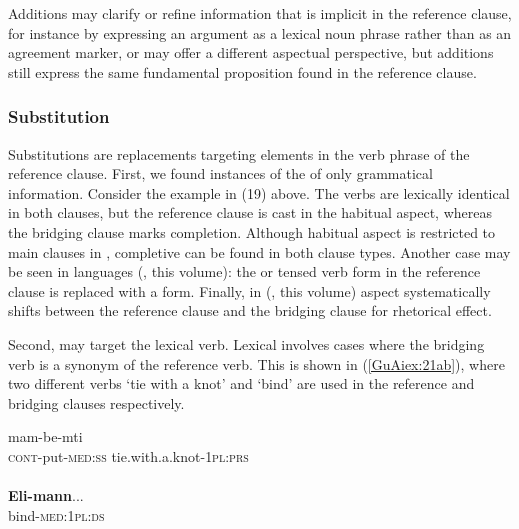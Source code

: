 \documentclass[output=paper]{LSP/langsci}
\begin{document}
Additions may clarify or refine information that is implicit in the reference clause, for instance by expressing an argument as a lexical noun phrase rather than as an agreement marker, or may offer a different aspectual perspective, but additions still express the same fundamental proposition found in the reference clause.

\subsubsection{Substitution}
\label{GuAi314subst}
Substitutions are replacements targeting elements in the verb phrase of the reference clause. First, we found instances of the  of only grammatical information. Consider the  example in (19) above. The verbs are lexically identical in both clauses, but the reference clause is cast in the habitual aspect, whereas the bridging clause marks completion. Although habitual aspect is restricted to main clauses in , completive can be found in both clause types. Another case may be seen in  languages (\citeauthor{anker18}, this volume): the  or tensed verb form in the reference clause is replaced with a  form. Finally, in  (\citeauthor{jarkey18}, this volume) aspect systematically shifts between the reference clause and the bridging clause for rhetorical effect.

Second,  may target the lexical verb. Lexical  involves cases where the bridging verb is a synonym of the reference verb. This is shown in (\ref{GuAiex:21ab}), where two different verbs `tie with a knot' and `bind' are used in the reference and bridging clauses respectively. 

\begin{exe}
\ex \label{GuAiex:21ab}
\begin{xlist}
\ex \label{GuAiex:21a}
\gll mam-be-mti     \underline{}\\
\textsc{cont}-put-\textsc{med:ss}   tie.with.a.knot-\textsc{1pl:prs} \\
\glt {} \\
\ex \label{GuAiex:21b}
\gll  \textbf{Eli-mann}...\\
bind-\textsc{med:1pl:ds}\\
\glt {}
\end{xlist}
\end{exe}
\end{document}
